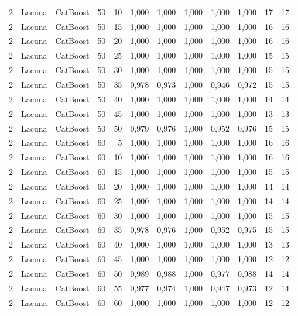 \begin{longtable}{@{}rllrrrrrrrrr@{}}
2 & Lacuna & CatBoost & 50 & 10 & 1,000 & 1,000 & 1,000 & 1,000 & 1,000 & 17 & 17 \\
2 & Lacuna & CatBoost & 50 & 15 & 1,000 & 1,000 & 1,000 & 1,000 & 1,000 & 16 & 16 \\
2 & Lacuna & CatBoost & 50 & 20 & 1,000 & 1,000 & 1,000 & 1,000 & 1,000 & 16 & 16 \\
2 & Lacuna & CatBoost & 50 & 25 & 1,000 & 1,000 & 1,000 & 1,000 & 1,000 & 15 & 15 \\
2 & Lacuna & CatBoost & 50 & 30 & 1,000 & 1,000 & 1,000 & 1,000 & 1,000 & 15 & 15 \\
2 & Lacuna & CatBoost & 50 & 35 & 0,978 & 0,973 & 1,000 & 0,946 & 0,972 & 15 & 15 \\
2 & Lacuna & CatBoost & 50 & 40 & 1,000 & 1,000 & 1,000 & 1,000 & 1,000 & 14 & 14 \\
2 & Lacuna & CatBoost & 50 & 45 & 1,000 & 1,000 & 1,000 & 1,000 & 1,000 & 13 & 13 \\
2 & Lacuna & CatBoost & 50 & 50 & 0,979 & 0,976 & 1,000 & 0,952 & 0,976 & 15 & 15 \\
2 & Lacuna & CatBoost & 60 & 5 & 1,000 & 1,000 & 1,000 & 1,000 & 1,000 & 16 & 16 \\
2 & Lacuna & CatBoost & 60 & 10 & 1,000 & 1,000 & 1,000 & 1,000 & 1,000 & 16 & 16 \\
2 & Lacuna & CatBoost & 60 & 15 & 1,000 & 1,000 & 1,000 & 1,000 & 1,000 & 15 & 15 \\
2 & Lacuna & CatBoost & 60 & 20 & 1,000 & 1,000 & 1,000 & 1,000 & 1,000 & 14 & 14 \\
2 & Lacuna & CatBoost & 60 & 25 & 1,000 & 1,000 & 1,000 & 1,000 & 1,000 & 14 & 14 \\
2 & Lacuna & CatBoost & 60 & 30 & 1,000 & 1,000 & 1,000 & 1,000 & 1,000 & 15 & 15 \\
2 & Lacuna & CatBoost & 60 & 35 & 0,978 & 0,976 & 1,000 & 0,952 & 0,975 & 15 & 15 \\
2 & Lacuna & CatBoost & 60 & 40 & 1,000 & 1,000 & 1,000 & 1,000 & 1,000 & 13 & 13 \\
2 & Lacuna & CatBoost & 60 & 45 & 1,000 & 1,000 & 1,000 & 1,000 & 1,000 & 12 & 12 \\
2 & Lacuna & CatBoost & 60 & 50 & 0,989 & 0,988 & 1,000 & 0,977 & 0,988 & 14 & 14 \\
2 & Lacuna & CatBoost & 60 & 55 & 0,977 & 0,974 & 1,000 & 0,947 & 0,973 & 12 & 14 \\
2 & Lacuna & CatBoost & 60 & 60 & 1,000 & 1,000 & 1,000 & 1,000 & 1,000 & 12 & 12 \\

\end{longtable}
